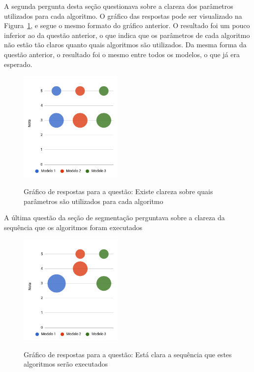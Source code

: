 \documentclass[12pt,oneside,a4paper,english,french,spanish,brazil,]{abntex2}
\begin{document}
A segunda pergunta desta seção questionava sobre a clareza dos parâmetros utilizados para cada algoritmo. O gráfico das respostas pode ser visualizado na Figura~\ref{fig:AJ_Qualidade_9}, e segue o mesmo formato do gráfico anterior. O resultado foi um pouco inferior ao da questão anterior, o que indica que os parâmetros de cada algoritmo não estão tão claros quanto quais algoritmos são utilizados. Da mesma forma da questão anterior, o resultado foi o mesmo entre todos os modelos, o que já era esperado.

\begin{figure}[ht]
\centering
\caption{Gráfico de respostas para a questão: Existe clareza sobre quais parâmetros são utilizados para cada algoritmo}
\includegraphics[width=0.45\textwidth]{imagens/Avaliacao_Juizes/Grafico_9.png}
\sourceAuthor{}
\label{fig:AJ_Qualidade_9}
\end{figure}

A última questão da seção de segmentação perguntava sobre a clareza da sequência que os algoritmos foram executados

\begin{figure}[ht]
\centering
\caption{Gráfico de respostas para a questão: Está clara a sequência que estes algoritmos serão executados}
\includegraphics[width=0.45\textwidth]{imagens/Avaliacao_Juizes/Grafico_10.png}
\sourceAuthor{}
\label{fig:AJ_Qualidade_10}
\end{figure}
\end{document}
